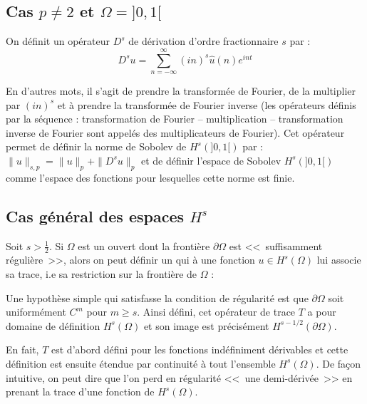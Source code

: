 \medskip
\subsection{Cas $p\neq 2$ et $\Omega = ]0,1[$}

On définit un opérateur $D^s$ de dérivation d'ordre fractionnaire $s$ par :
\begin{equation}
D^{s}u=\sum_{n=-\infty}^\infty (in)^s\widehat{u}(n)e^{int}
\end{equation}

En d'autres mots, il s'agit de prendre la transformée de Fourier, de la multiplier par $(in)^s$ et
à prendre la transformée de Fourier inverse (les opérateurs définis par la séquence :
transformation de Fourier -- multiplication -- transformation inverse de Fourier sont appelés des
multiplicateurs de Fourier).
Cet opérateur permet de définir la norme de Sobolev de $H^s(]0,1[)$ par :
$\|u\|_{s,p}=\|u\|_p+\|D^s u\|_p$ et de définir l'espace de Sobolev $H^s(]0,1[)$
comme l'espace des fonctions pour lesquelles cette norme est finie.

\medskip
\subsection{Cas général des espaces $H^s$}

Soit $s > \frac{1}{2}$. Si $\Omega$ est un ouvert dont la frontière $\partial \Omega$ est
<<~suffisamment régulière~>>, alors on peut définir un 
qui à une fonction $u \in H^{s}(\Omega)$ lui associe sa trace, i.e sa restriction sur la
frontière de $\Omega$ : 

Une hypothèse simple qui satisfasse la condition de régularité est que $\partial \Omega$
soit uniformément $C^m$ pour $m \geqslant s$.
Ainsi défini, cet opérateur de trace $T$ a pour domaine de définition $H^s(\Omega)$ et
son image est précisément $H^{s-1/2}(\partial \Omega)$.

En fait, $T$ est d'abord défini pour les fonctions indéfiniment dérivables et cette définition
est ensuite étendue par continuité à tout l'ensemble $H^s(\Omega)$.
De façon intuitive, on peut dire que l'on perd en régularité <<~une demi-dérivée~>> en prenant
la trace d'une fonction de $H^s(\Omega)$.



